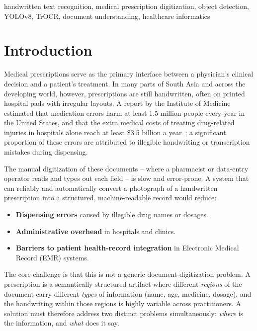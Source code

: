 \documentclass[conference]{IEEEtran}
\begin{document}
\begin{IEEEkeywords}
handwritten text recognition, medical prescription digitization, object detection, YOLOv8, TrOCR, document understanding, healthcare informatics
\end{IEEEkeywords}

\section{Introduction}
\label{sec:intro}

Medical prescriptions serve as the primary interface between a physician's clinical decision and a patient's treatment. In many parts of South Asia and across the developing world, however, prescriptions are still handwritten, often on printed hospital pads with irregular layouts. A report by the Institute of Medicine estimated that medication errors harm at least 1.5 million people every year in the United States, and that the extra medical costs of treating drug-related injuries in hospitals alone reach at least \$3.5 billion a year~\cite{iom2007medicationerrors}; a significant proportion of these errors are attributed to illegible handwriting or transcription mistakes during dispensing.

The manual digitization of these documents -- where a pharmacist or data-entry operator reads and types out each field -- is slow and error-prone. A system that can reliably and automatically convert a photograph of a handwritten prescription into a structured, machine-readable record would reduce:
\begin{itemize}
  \item \textbf{Dispensing errors} caused by illegible drug names or dosages.
  \item \textbf{Administrative overhead} in hospitals and clinics.
  \item \textbf{Barriers to patient health-record integration} in Electronic Medical Record (EMR) systems.
\end{itemize}

The core challenge is that this is not a generic document-digitization problem. A prescription is a semantically structured artifact where different \emph{regions} of the document carry different \emph{types} of information (name, age, medicine, dosage), and the handwriting within those regions is highly variable across practitioners. A solution must therefore address two distinct problems simultaneously: \emph{where} is the information, and \emph{what} does it say.
\end{document}
